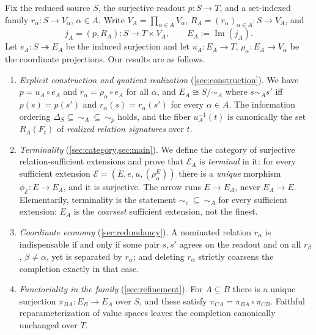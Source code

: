 \documentclass[11pt,reqno]{amsart}
\theoremstyle{plain}
\theoremstyle{definition}
\theoremstyle{remark}
\numberwithin{equation}{section}
\DeclareMathOperator{\Image}{Im}
\begin{document}
Fix the reduced source $S$, the surjective readout $p\colon S\to T$, and a set-indexed family
$r_\alpha\colon S\to V_\alpha$, $\alpha\in A$. Write $V_A=\prod_{\alpha\in A}V_\alpha$,
$R_A=(r_\alpha)_{\alpha\in A}\colon S\to V_A$, and
\begin{equation}
\label{eq:jA-intro}
j_A=(p,R_A)\colon S\longrightarrow T\times V_A,
\qquad
E_A:=\Image(j_A).
\end{equation}
Let $e_A\colon S\twoheadrightarrow E_A$ be the induced surjection and let
$u_A\colon E_A\to T$, $\rho_\alpha\colon E_A\to V_\alpha$ be the coordinate projections. Our
results are as follows.

\begin{enumerate}
\item \emph{Explicit construction and quotient realization} (\cref{sec:construction}). We have
$p=u_A\circ e_A$ and $r_\alpha=\rho_\alpha\circ e_A$ for all $\alpha$, and $E_A\cong S/\!\sim_A$
where $s\sim_A s'$ iff $p(s)=p(s')$ and $r_\alpha(s)=r_\alpha(s')$ for every $\alpha\in A$. The
information ordering $\Delta_S\subseteq\ \sim_A\ \subseteq\ \sim_p$ holds, and the fiber
$u_A^{-1}(t)$ is canonically the set $R_A(F_t)$ of \emph{realized relation signatures} over $t$.

\item \emph{Terminality} (\cref{sec:category,sec:main}). We define the category of surjective
relation-sufficient extensions and prove that $\mathcal{E}_A$ is \emph{terminal} in it: for every
sufficient extension $\mathcal E=(E,e,u,(\rho_\alpha^E))$ there is a \emph{unique} morphism
$\phi_{\mathcal E}\colon E\to E_A$, and it is surjective. The arrow runs $E\to E_A$, never
$E_A\to E$. Elementarily, terminality is the statement $\sim_e\ \subseteq\ \sim_A$ for every
sufficient extension: $E_A$ is the \emph{coarsest} sufficient extension, not the finest.

\item \emph{Coordinate economy} (\cref{sec:redundancy}). A nominated relation $r_\alpha$ is
indispensable if and only if some pair $s,s'$ agrees on the readout and on all
$r_\beta$, $\beta\neq\alpha$, yet is separated by $r_\alpha$; and deleting $r_\alpha$ strictly
coarsens the completion exactly in that case.

\item \emph{Functoriality in the family} (\cref{sec:refinement}). For $A\subseteq B$ there is a
unique surjection $\pi_{BA}\colon E_B\to E_A$ over $S$, and these satisfy
$\pi_{CA}=\pi_{BA}\circ\pi_{CB}$. Faithful reparameterization of value spaces leaves the completion
canonically unchanged over $T$.


\end{enumerate}
\end{document}
